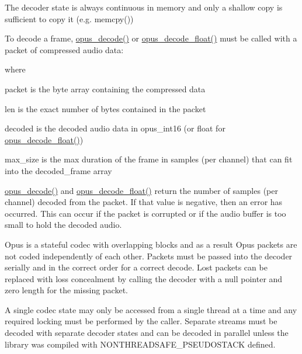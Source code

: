 The decoder state is always continuous in memory and only a shallow copy is sufficient to copy it (e.\+g. memcpy())

To decode a frame, \mbox{\hyperlink{group__opus__decoder_ga3df1ea406cd9d23a63aed181903d3e5e}{opus\+\_\+decode()}} or \mbox{\hyperlink{group__opus__decoder_gafe994758c0d6fa49cd38d63331d47bd4}{opus\+\_\+decode\+\_\+float()}} must be called with a packet of compressed audio data\+: 
\begin{DoxyCode}{0}
\end{DoxyCode}
 where

\begin{DoxyItemize}
\item packet is the byte array containing the compressed data \item len is the exact number of bytes contained in the packet \item decoded is the decoded audio data in opus\+\_\+int16 (or float for \mbox{\hyperlink{group__opus__decoder_gafe994758c0d6fa49cd38d63331d47bd4}{opus\+\_\+decode\+\_\+float()}}) \item max\+\_\+size is the max duration of the frame in samples (per channel) that can fit into the decoded\+\_\+frame array\end{DoxyItemize}
\mbox{\hyperlink{group__opus__decoder_ga3df1ea406cd9d23a63aed181903d3e5e}{opus\+\_\+decode()}} and \mbox{\hyperlink{group__opus__decoder_gafe994758c0d6fa49cd38d63331d47bd4}{opus\+\_\+decode\+\_\+float()}} return the number of samples (per channel) decoded from the packet. If that value is negative, then an error has occurred. This can occur if the packet is corrupted or if the audio buffer is too small to hold the decoded audio.

Opus is a stateful codec with overlapping blocks and as a result Opus packets are not coded independently of each other. Packets must be passed into the decoder serially and in the correct order for a correct decode. Lost packets can be replaced with loss concealment by calling the decoder with a null pointer and zero length for the missing packet.

A single codec state may only be accessed from a single thread at a time and any required locking must be performed by the caller. Separate streams must be decoded with separate decoder states and can be decoded in parallel unless the library was compiled with N\+O\+N\+T\+H\+R\+E\+A\+D\+S\+A\+F\+E\+\_\+\+P\+S\+E\+U\+D\+O\+S\+T\+A\+CK defined. 

